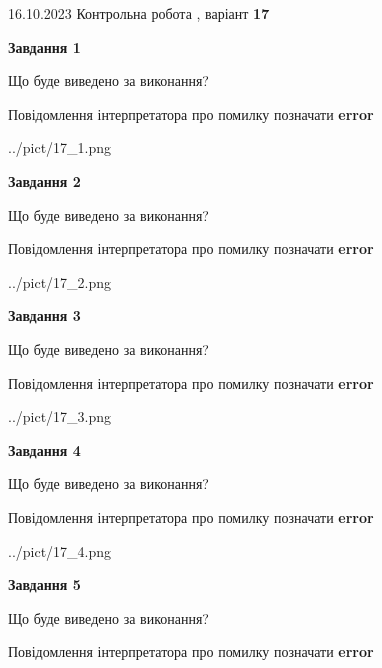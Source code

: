\documentclass[12pt, ukrainian]{article}
\begin{document}
{\Large{16.10.2023 Контрольна робота , варіант  \No \textbf { 17 }\par}}
{
\begin {large}
{\begin {center}\textbf{Завдання 1}\end {center}}\par
Що буде виведено за виконання? \par
Повідомлення інтерпретатора про помилку позначати \textbf{error}

\begin{center}
	{../pict/17_1.png}
\end{center}
\newpage

{\begin {center}\textbf{Завдання 2}\end {center}}\par
Що буде виведено за виконання? \par
Повідомлення інтерпретатора про помилку позначати \textbf{error}

\begin{center}
	{../pict/17_2.png}
\end{center}
\newpage

{\begin {center}\textbf{Завдання 3}\end {center}}\par
Що буде виведено за виконання? \par
Повідомлення інтерпретатора про помилку позначати \textbf{error}

\begin{center}
	{../pict/17_3.png}
\end{center}
\newpage

{\begin {center}\textbf{Завдання 4}\end {center}}\par
Що буде виведено за виконання? \par
Повідомлення інтерпретатора про помилку позначати \textbf{error}

\begin{center}
	{../pict/17_4.png}
\end{center}
\newpage

{\begin {center}\textbf{Завдання 5}\end {center}}\par
Що буде виведено за виконання? \par
Повідомлення інтерпретатора про помилку позначати \textbf{error}


\end{large}}
\end{document}

